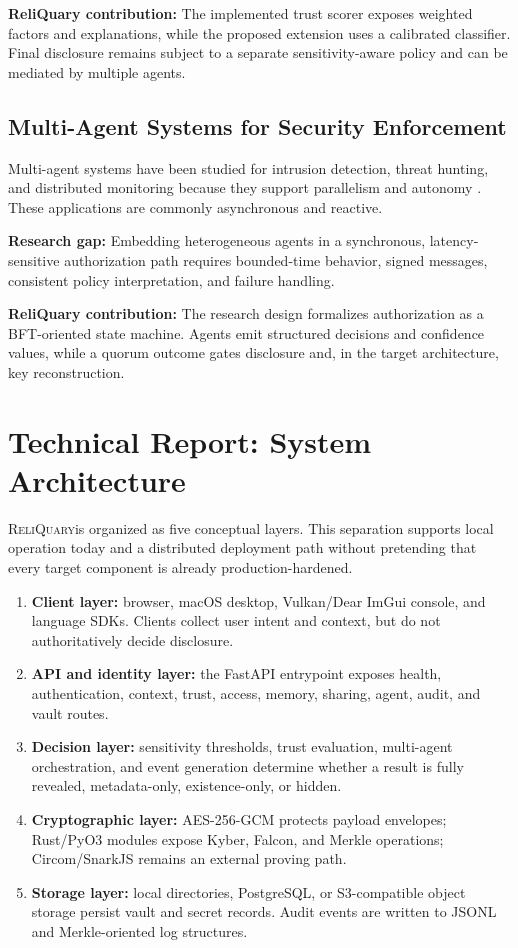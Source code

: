 \documentclass[10pt]{article}
\newcommand{\system}{\textsc{ReliQuary}}
\let\cite\citep
\begin{document}
\textbf{ReliQuary contribution:} The implemented trust scorer exposes weighted factors and explanations, while the proposed extension uses a calibrated classifier. Final disclosure remains subject to a separate sensitivity-aware policy and can be mediated by multiple agents.

\subsection*{Multi-Agent Systems for Security Enforcement}

Multi-agent systems have been studied for intrusion detection, threat hunting, and distributed monitoring because they support parallelism and autonomy \cite{masintro}. These applications are commonly asynchronous and reactive.

\textbf{Research gap:} Embedding heterogeneous agents in a synchronous, latency-sensitive authorization path requires bounded-time behavior, signed messages, consistent policy interpretation, and failure handling.

\textbf{ReliQuary contribution:} The research design formalizes authorization as a BFT-oriented state machine. Agents emit structured decisions and confidence values, while a quorum outcome gates disclosure and, in the target architecture, key reconstruction.

\section*{Technical Report: System Architecture}

\system is organized as five conceptual layers. This separation supports local operation today and a distributed deployment path without pretending that every target component is already production-hardened.

\begin{enumerate}
\item \textbf{Client layer:} browser, macOS desktop, Vulkan/Dear ImGui console, and language SDKs. Clients collect user intent and context, but do not authoritatively decide disclosure.
\item \textbf{API and identity layer:} the FastAPI entrypoint exposes health, authentication, context, trust, access, memory, sharing, agent, audit, and vault routes.
\item \textbf{Decision layer:} sensitivity thresholds, trust evaluation, multi-agent orchestration, and event generation determine whether a result is fully revealed, metadata-only, existence-only, or hidden.
\item \textbf{Cryptographic layer:} AES-256-GCM protects payload envelopes; Rust/PyO3 modules expose Kyber, Falcon, and Merkle operations; Circom/SnarkJS remains an external proving path.
\item \textbf{Storage layer:} local directories, PostgreSQL, or S3-compatible object storage persist vault and secret records. Audit events are written to JSONL and Merkle-oriented log structures.
\end{enumerate}
\end{document}
